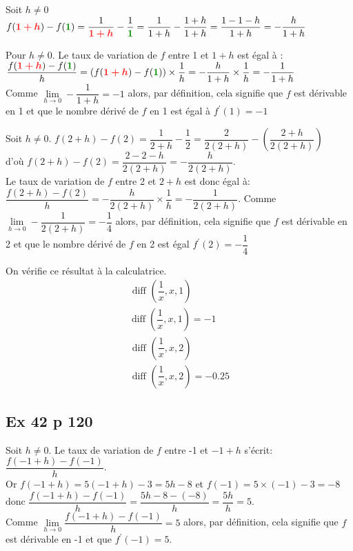 \documentclass[12pt,a4paper]{book}
\begin{document}
\begin{enumMet}
\item \begin{enumMet}
    \item Soit $h \neq 0$ $f(\mRouge{1+h})-f(\mVert{1})=\dfrac{1}{\mRouge{1+h}}-\dfrac{1}{\mVert{1}}=\dfrac{1}{1+h}-\dfrac{1+h}{1+h}=\dfrac{1-1-h}{1+h}=-\dfrac{h}{1+h}$
    \item Pour $h \neq 0$. Le taux de variation de $f$ entre 1 et $1+h$ est égal à :\\
    $\dfrac{f(\mRouge{1+h})-f(\mVert{1})}{h}=(f(\mRouge{1+h})-f(\mVert{1})) \times \dfrac{1}{h}=-\dfrac{h}{1+h} \times \dfrac{1}{h}=-\dfrac{1}{1+h}$\\
    Comme $\lim\limits_{h \rightarrow 0} -\dfrac{1}{1+h}=-1$ alors, par définition, cela signifie que $f$ est dérivable en 1 et que le nombre dérivé de $f$ en 1 est égal à $f^{\prime}(1)=-1$
\end{enumMet}
\item Soit $h \neq 0$. $f(2+h)-f(2)=\dfrac{1}{2+h}-\dfrac{1}{2}=\dfrac{2}{2(2+h)}-\left(\dfrac{2+h}{2(2+h)}\right)$\\ d'où
$f(2+h)-f(2)=\dfrac{2-2-h}{2(2+h)}=-\dfrac{h}{2(2+h)}$.\\
Le taux de variation de $f$ entre 2 et $2+h$ est donc égal à:\\ $\dfrac{f(2+h)-f(2)}{h}=-\dfrac{h}{2(2+h)} \times \dfrac{1}{h}=-\dfrac{1}{2(2+h)}$. Comme $\lim\limits_{h \rightarrow 0} -\dfrac{1}{2(2+h)}=-\dfrac{1}{4}$ alors, par définition, cela signifie que $f$ est
dérivable en 2 et que le nombre dérivé de $f$ en 2 est égal $f^{\prime}(2)=-\dfrac{1}{4}$
\item On vérifie ce résultat à la calculatrice.
$$
\begin{array}{c}
\text { diff }\left(\dfrac{1}{x}, x, 1\right)\\
\operatorname{diff}\left(\dfrac{1}{x}, x, 1\right) =-1 \\
\text { diff }\left(\dfrac{1}{x}, x, 2\right) \\
\text { diff }\left(\dfrac{1}{x}, x, 2\right) =-0.25
\end{array}
$$
\end{enumMet}

\subsection*{Ex 42 p 120}

Soit $h \neq 0$. Le taux de variation de $f$ entre -1 et $-1+h$ s'écrit: $\dfrac{f(-1+h)-f(-1)}{h}$.\\
Or $f(-1+h)=5(-1+h)-3=5 h-8$ et $f(-1)=5 \times(-1)-3=-8$\\
donc $\dfrac{f(-1+h)-f(-1)}{h}=\dfrac{5 h-8-(-8)}{h}=\dfrac{5 h}{h}=5$. \\
Comme $\lim\limits_{h \rightarrow 0} \dfrac{f(-1+h)-f(-1)}{h}=5$ alors, par définition, cela signifie que $f$ est dérivable en -1 et que $f^{\prime}(-1)=5$.
\end{document}

